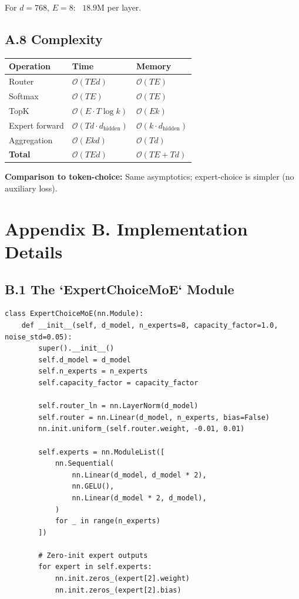 For $d = 768$, $E = 8$: ~$18.9$M per layer.

\subsection{A.8 Complexity}

\begin{table}[H]
\centering
\small
\begin{tabular}{lll}
\toprule
\textbf{Operation} & \textbf{Time} & \textbf{Memory} \\
\midrule
Router & $\mathcal{O}(T E d)$ & $\mathcal{O}(T E)$ \\
Softmax & $\mathcal{O}(T E)$ & $\mathcal{O}(T E)$ \\
TopK & $\mathcal{O}(E \cdot T \log k)$ & $\mathcal{O}(E k)$ \\
Expert forward & $\mathcal{O}(T d \cdot d_\text{hidden})$ & $\mathcal{O}(k \cdot d_\text{hidden})$ \\
Aggregation & $\mathcal{O}(E k d)$ & $\mathcal{O}(T d)$ \\
\textbf{Total} & $\mathcal{O}(T E d)$ & $\mathcal{O}(T E + T d)$ \\
\bottomrule
\end{tabular}
\end{table}

\textbf{Comparison to token-choice:} Same asymptotics; expert-choice is simpler 
(no auxiliary loss).



\section{Appendix B. Implementation Details}

\subsection{B.1 The `ExpertChoiceMoE` Module}

\begin{lstlisting}
class ExpertChoiceMoE(nn.Module):
    def __init__(self, d_model, n_experts=8, capacity_factor=1.0, noise_std=0.05):
        super().__init__()
        self.d_model = d_model
        self.n_experts = n_experts
        self.capacity_factor = capacity_factor
        
        self.router_ln = nn.LayerNorm(d_model)
        self.router = nn.Linear(d_model, n_experts, bias=False)
        nn.init.uniform_(self.router.weight, -0.01, 0.01)
        
        self.experts = nn.ModuleList([
            nn.Sequential(
                nn.Linear(d_model, d_model * 2),
                nn.GELU(),
                nn.Linear(d_model * 2, d_model),
            )
            for _ in range(n_experts)
        ])
        
        # Zero-init expert outputs
        for expert in self.experts:
            nn.init.zeros_(expert[2].weight)
            nn.init.zeros_(expert[2].bias)
\end{lstlisting}

